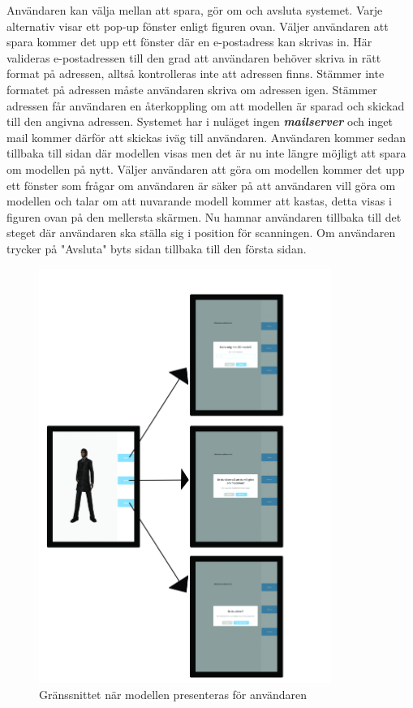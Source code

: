 \documentclass[a4paper,12pt,oneside,final]{extbook}
\begin{document}
Användaren kan välja mellan att spara, gör om och avsluta systemet. Varje alternativ visar ett pop-up fönster enligt figuren ovan. Väljer användaren att spara kommer det upp ett fönster där en e-postadress kan skrivas in. Här valideras e-postadressen till den grad att användaren behöver skriva in rätt format på adressen, alltså kontrolleras inte att adressen finns. Stämmer inte formatet på adressen måste användaren skriva om adressen igen. Stämmer adressen får användaren en återkoppling om att modellen är sparad och skickad till den angivna adressen. Systemet har i nuläget ingen \textbf{\emph{mailserver}} och inget mail kommer därför att skickas iväg till användaren. Användaren kommer sedan tillbaka till sidan där modellen visas men det är nu inte längre möjligt att spara om modellen på nytt. Väljer användaren att göra om modellen kommer det upp ett fönster som frågar om användaren är säker på att användaren vill göra om modellen och talar om att nuvarande modell kommer att kastas, detta visas i figuren ovan på den mellersta skärmen. Nu hamnar användaren tillbaka till det steget där användaren ska ställa sig i position för scanningen. Om användaren trycker på "Avsluta" byts sidan tillbaka till den första sidan. 


\begin{figure}[H!]
  \centering
  \includegraphics[width=0.85\textwidth]{bilder/save_doover.jpg}
  \caption{Gränssnittet när modellen presenteras för användaren}
  \label{fig:gui2}
\end{figure}
\end{document}
